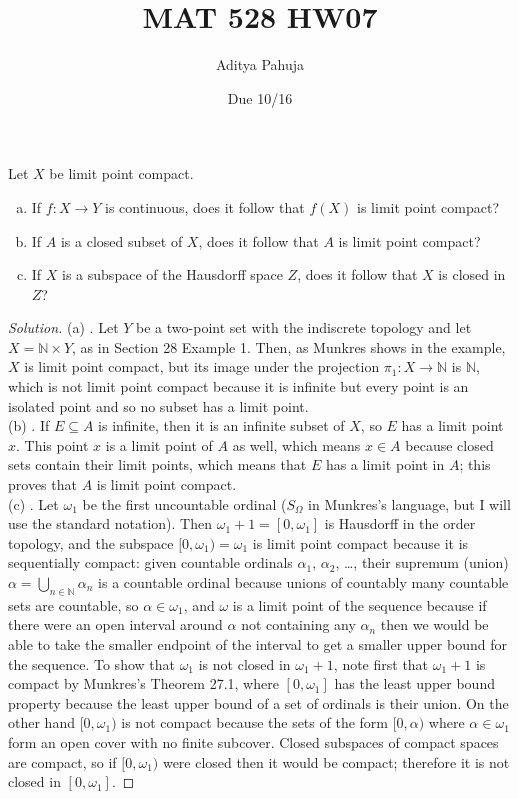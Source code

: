 \documentclass[10pt]{article}
\title{MAT 528 HW07}
\author{\large Aditya Pahuja}
\date{\large Due 10/16}
\providecommand{\NN}{\mathbb N}
\providecommand{\ii}{\item}
\newenvironment{soln}{\begin{proof}[Solution]}{\end{proof}}
\begin{document}
\maketitle

\begin{problem}
    [Munkres 28.3]
    Let $X$ be limit point compact.
    \begin{enumerate}[(a)]
        \ii If $f\colon X\to Y$ is continuous,
	does it follow that $f(X)$ is limit point compact?
	\ii If $A$ is a closed subset of $X$, does it follow that
	$A$ is limit point compact?
	\ii If $X$ is a subspace of the Hausdorff space $Z$,
	does it follow that $X$ is closed in $Z$?
    \end{enumerate}
\end{problem}

\begin{soln}
    (a) .
    Let $Y$ be a two-point set with the indiscrete topology
    and let $X = \NN\times Y$, as in Section 28 Example 1.
    Then, as Munkres shows in the example, $X$ is limit point compact,
    but its image under the projection $\pi_1\colon X\to\NN$
    is $\NN$, which is not limit point compact because it is infinite but
    every point is an isolated point and so no subset has a limit point.
    \\

    (b) .
    If $E\subseteq A$ is infinite, then it is an infinite subset of $X$,
    so $E$ has a limit point $x$. This point $x$ is a limit point of $A$ as well,
    which means $x\in A$ because closed sets contain their limit points,
    which means that $E$ has a limit point in $A$;
    this proves that $A$ is limit point compact.
    \\

    (c) . Let $\omega_1$ be the first uncountable ordinal
    ($S_{\Omega}$ in Munkres's language, but I will use the standard notation).
    Then $\omega_1+1 = [0,\omega_1]$ is Hausdorff in the order topology,
    and the subspace $[0,\omega_1) = \omega_1$ is limit point compact
    because it is sequentially compact:
    given countable ordinals $\alpha_1$, $\alpha_2$, \dots,
    their supremum (union) $\alpha = \bigcup_{n\in\NN}\alpha_n$ is a countable ordinal
    because unions of countably many countable sets are countable,
    so $\alpha\in\omega_1$, and $\omega$ is a limit point of the sequence
    because if there were an open interval around $\alpha$ not containing
    any $\alpha_n$ then we would be able to take the smaller endpoint of the interval
    to get a smaller upper bound for the sequence.
    To show that $\omega_1$ is not closed in $\omega_1+1$,
    note first that $\omega_1+1$ is compact by Munkres's
    Theorem 27.1, where $[0,\omega_1]$ has the least upper bound property
    because the least upper bound of a set of ordinals is their union.
    On the other hand $[0,\omega_1)$ is not compact because
    the sets of the form $[0,\alpha)$ where $\alpha\in\omega_1$
    form an open cover with no finite subcover.
    Closed subspaces of compact spaces are compact,
    so if $[0,\omega_1)$ were closed then it would be compact;
    therefore it is not closed in $[0,\omega_1]$.
\end{soln}
\end{document}
